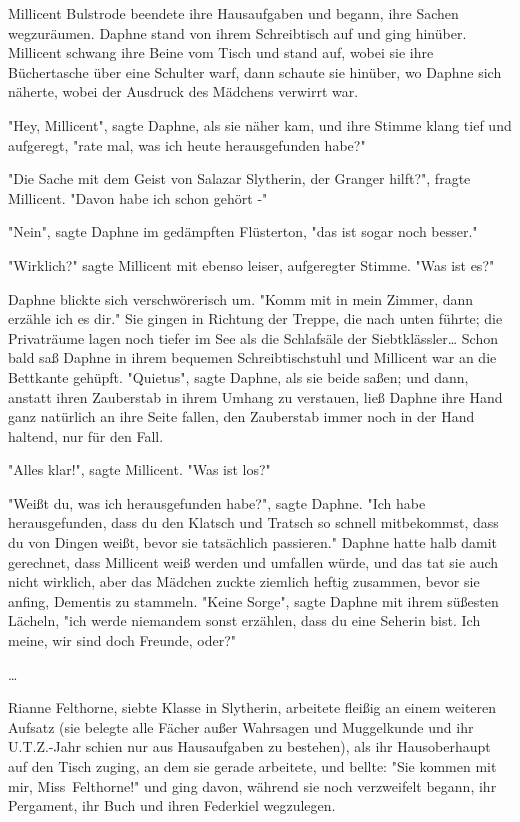 {Millicent Bulstrode beendete ihre Hausaufgaben und begann, ihre Sachen wegzuräumen. Daphne stand von ihrem Schreibtisch auf und ging hinüber. Millicent schwang ihre Beine vom Tisch und stand auf, wobei sie ihre Büchertasche über eine Schulter warf, dann schaute sie hinüber, wo Daphne sich näherte, wobei der Ausdruck des Mädchens verwirrt war.

"Hey, Millicent", sagte Daphne, als sie näher kam, und ihre Stimme klang tief und aufgeregt, "rate mal, was ich heute herausgefunden habe?"

"Die Sache mit dem Geist von Salazar Slytherin, der Granger hilft?", fragte Millicent. "Davon habe ich schon gehört -"

"Nein", sagte Daphne im gedämpften Flüsterton, "das ist sogar noch besser."

"Wirklich?" sagte Millicent mit ebenso leiser, aufgeregter Stimme. "Was ist es?"

Daphne blickte sich verschwörerisch um. "Komm mit in mein Zimmer, dann erzähle ich es dir." Sie gingen in Richtung der Treppe, die nach unten führte; die Privaträume lagen noch tiefer im See als die Schlafsäle der Siebtklässler… Schon bald saß Daphne in ihrem bequemen Schreibtischstuhl und Millicent war an die Bettkante gehüpft. "Quietus", sagte Daphne, als sie beide saßen; und dann, anstatt ihren Zauberstab in ihrem Umhang zu verstauen, ließ Daphne ihre Hand ganz natürlich an ihre Seite fallen, den Zauberstab immer noch in der Hand haltend, nur für den Fall.

"Alles klar!", sagte Millicent. "Was ist los?"

"Weißt du, was ich herausgefunden habe?", sagte Daphne. "Ich habe herausgefunden, dass du den Klatsch und Tratsch so schnell mitbekommst, dass du von Dingen weißt, bevor sie tatsächlich passieren." Daphne hatte halb damit gerechnet, dass Millicent weiß werden und umfallen würde, und das tat sie auch nicht wirklich, aber das Mädchen zuckte ziemlich heftig zusammen, bevor sie anfing, Dementis zu stammeln. "Keine Sorge", sagte Daphne mit ihrem süßesten Lächeln, "ich werde niemandem sonst erzählen, dass du eine Seherin bist. Ich meine, wir sind doch Freunde, oder?"

…

Rianne Felthorne, siebte Klasse in Slytherin, arbeitete fleißig an einem weiteren Aufsatz (sie belegte alle Fächer außer Wahrsagen und Muggelkunde und ihr U.T.Z.-Jahr schien nur aus Hausaufgaben zu bestehen), als ihr Hausoberhaupt auf den Tisch zuging, an dem sie gerade arbeitete, und bellte: "Sie kommen mit mir, Miss~Felthorne!" und ging davon, während sie noch verzweifelt begann, ihr Pergament, ihr Buch und ihren Federkiel wegzulegen.

}
